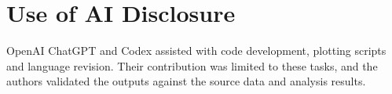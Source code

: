 \section{Use of AI Disclosure}

OpenAI ChatGPT and Codex assisted with code development, plotting scripts and language revision.
Their contribution was limited to these tasks, and the authors validated the
outputs against the source data and analysis results.
